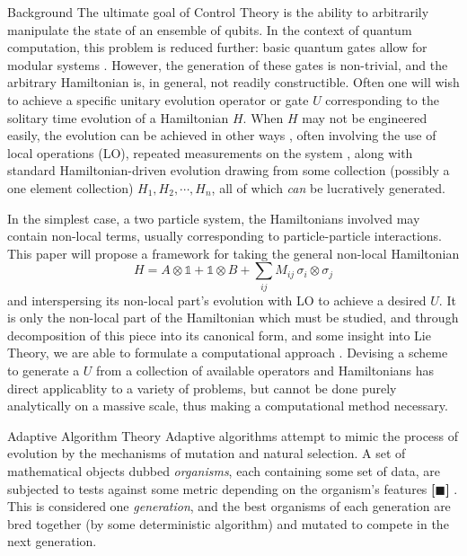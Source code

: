 \documentclass[14pt]{beamer}
\newcommand{\cit}{\textbf{[$\blacksquare$] }}
\begin{document}
	\begin{frame}
		\begin{columns}
			\begin{column}{.45\textwidth}
				\begin{exampleblock}{Background}
					The ultimate goal of Control Theory is the ability to arbitrarily manipulate the state of an ensemble of qubits. In the context of quantum computation, this problem is reduced further: basic quantum gates allow for modular systems \cite{bremner}. However, the generation of these gates is non-trivial, and the arbitrary Hamiltonian is, in general, not readily constructible. Often one will wish to achieve a specific unitary evolution operator or gate $U$ corresponding to the solitary time evolution of a Hamiltonian $H$. When $H$ may not be engineered easily, the evolution can be achieved in other ways \cite{bremner} , often involving the use of local operations (LO), repeated measurements on the system \cite{bennett}, along with standard Hamiltonian-driven evolution drawing from some collection (possibly a one element collection) $H_1, H_2, \cdots, H_n$, all of which \emph{can} be lucratively generated.

	In the simplest case, a two particle system, the Hamiltonians involved may contain non-local terms, usually corresponding to particle-particle interactions. This paper will propose a framework for taking the general non-local Hamiltonian \cite{bennett} 
	\begin{equation}
	H = A \otimes \mathds{1} + \mathds{1} \otimes B + \sum_{ij} M_{ij}\,  \sigma_i \otimes \sigma_j
	\end{equation}
	and interspersing its non-local part's evolution with LO to achieve a desired $U$. It is only the non-local part of the Hamiltonian which must be studied, and through decomposition of this piece into its canonical form, and some insight into Lie Theory, we are able to formulate a computational approach \cite{haselgrove}. Devising a scheme to generate a $U$ from a collection of available operators and Hamiltonians has direct applicablity to a variety of problems, but cannot be done purely analytically on a massive scale, thus making a computational method necessary.
				\end{exampleblock}
				\begin{block}{Adaptive Algorithm Theory}
	Adaptive algorithms attempt to mimic the process of evolution by the mechanisms of mutation and natural selection. A set of mathematical objects dubbed \emph{organisms}, each containing some set of data, are subjected to tests against some metric depending on the organism's features \cit. This is considered one \emph{generation}, and the best organisms of each generation are bred together (by some deterministic algorithm) and mutated to compete in the next generation.


\end{block}
\end{column}
\end{columns}
\end{frame}
\end{document}
